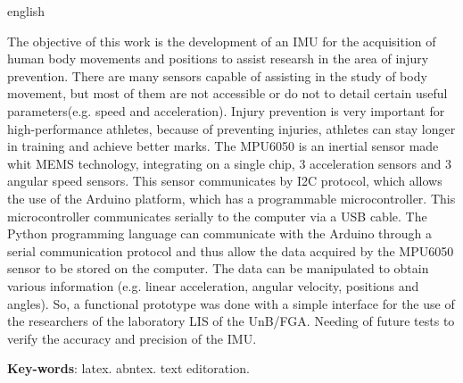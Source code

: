 \begin{resumo}[Abstract]
 \begin{otherlanguage*}{english}
 	
 	The objective of this work is the development of an IMU for the acquisition of human body movements and positions to assist researsh in the area of injury prevention. There are many sensors capable of assisting in the study of body movement, but most of them are not accessible or do not to detail certain useful parameters(e.g. speed and acceleration). Injury prevention is very important for high-performance athletes, because of preventing injuries, athletes can stay longer in training and achieve better marks. The MPU6050 is an inertial sensor made whit MEMS technology, integrating on a single chip, 3 acceleration sensors and 3 angular speed sensors. This sensor communicates by I2C protocol, which allows the use of the Arduino platform, which has a programmable microcontroller. This microcontroller communicates serially to the computer via a USB cable. The Python programming language can communicate with the Arduino through a serial communication protocol and thus allow the data acquired by the MPU6050 sensor to be stored on the computer. The data can be manipulated to obtain various information (e.g. linear acceleration, angular velocity, positions and angles). So, a functional prototype was done with a simple interface for the use of the researchers of the laboratory LIS of the UnB/FGA. Needing of future tests to verify the accuracy and precision of the IMU.

   \vspace{\onelineskip}
 
   \noindent 
   \textbf{Key-words}: latex. abntex. text editoration.
 \end{otherlanguage*}
\end{resumo}
